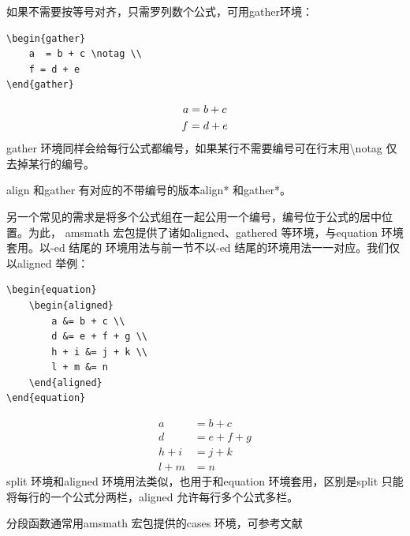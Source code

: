 如果不需要按等号对齐，只需罗列数个公式，可用gather环境：
\begin{lstlisting}
\begin{gather}
	a  = b + c \notag \\
	f = d + e 
\end{gather}
\end{lstlisting}
\begin{gather}
	a  = b + c \notag  \\
	f = d + e 
\end{gather}
gather 环境同样会给每行公式都编号，如果某行不需要编号可在行末用\textbackslash{}notag 仅去掉某行的编号。

align 和gather 有对应的不带编号的版本align* 和gather*。

另一个常见的需求是将多个公式组在一起公用一个编号，编号位于公式的居中位置。为此，
amsmath 宏包提供了诸如aligned、gathered 等环境，与equation 环境套用。以-ed 结尾的
环境用法与前一节不以-ed 结尾的环境用法一一对应。我们仅以aligned 举例：
\begin{lstlisting}
\begin{equation}
	\begin{aligned}
		a &= b + c \\
		d &= e + f + g \\
		h + i &= j + k \\
		l + m &= n
	\end{aligned}
\end{equation}
\end{lstlisting}
\begin{equation}
	\begin{aligned}
		a &= b + c \\
		d &= e + f + g \\
		h + i &= j + k \\
		l + m &= n
	\end{aligned}
\end{equation}
split 环境和aligned 环境用法类似，也用于和equation 环境套用，区别是split 只能
将每行的一个公式分两栏，aligned 允许每行多个公式多栏。

分段函数通常用amsmath 宏包提供的cases 环境，可参考文献\parencite{_c}

